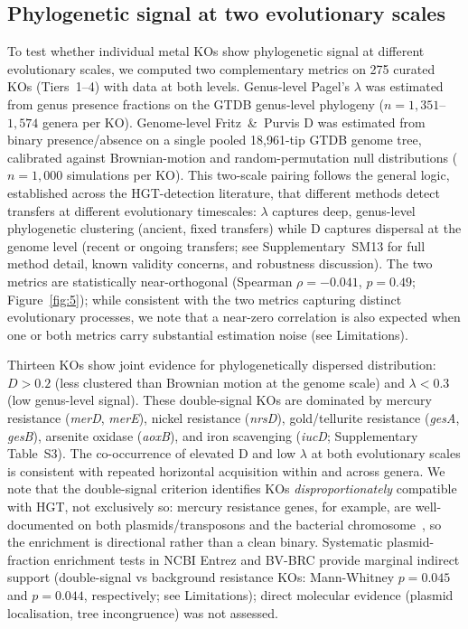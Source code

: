 \documentclass[times]{zHenriquesLab-StyleBioRxiv}
\begin{document}


\subsection{Phylogenetic signal at two evolutionary scales}
\label{ss:phylod}

To test whether individual metal KOs show phylogenetic signal at different evolutionary scales, we computed two complementary metrics on 275 curated KOs (Tiers~1--4) with data at both levels.
Genus-level Pagel's $\lambda$ was estimated from genus presence fractions on the GTDB genus-level phylogeny ($n = 1{,}351$--$1{,}574$ genera per KO).
Genome-level Fritz~\&~Purvis D was estimated from binary presence/absence on a single pooled 18{,}961-tip GTDB genome tree, calibrated against Brownian-motion and random-permutation null distributions ($n = 1{,}000$ simulations per KO).
This two-scale pairing follows the general logic, established across the HGT-detection literature, that different methods detect transfers at different evolutionary timescales: $\lambda$ captures deep, genus-level phylogenetic clustering (ancient, fixed transfers) while D captures dispersal at the genome level (recent or ongoing transfers; see Supplementary~SM13 for full method detail, known validity concerns, and robustness discussion).
The two metrics are statistically near-orthogonal (Spearman $\rho = -0.041$, $p = 0.49$; Figure~\ref{fig:5}); while consistent with the two metrics capturing distinct evolutionary processes, we note that a near-zero correlation is also expected when one or both metrics carry substantial estimation noise (see Limitations).

Thirteen KOs show joint evidence for phylogenetically dispersed distribution: $D > 0.2$ (less clustered than Brownian motion at the genome scale) and $\lambda < 0.3$ (low genus-level signal). These double-signal KOs are dominated by mercury resistance (\textit{merD}, \textit{merE}), nickel resistance (\textit{nrsD}), gold/tellurite resistance (\textit{gesA}, \textit{gesB}), arsenite oxidase (\textit{aoxB}), and iron scavenging (\textit{iucD}; Supplementary Table~S3). The co-occurrence of elevated D and low $\lambda$ at both evolutionary scales is consistent with repeated horizontal acquisition within and across genera. We note that the double-signal criterion identifies KOs \emph{disproportionately} compatible with HGT, not exclusively so: mercury resistance genes, for example, are well-documented on both plasmids/transposons and the bacterial chromosome~\cite{silver2005}, so the enrichment is directional rather than a clean binary. Systematic plasmid-fraction enrichment tests in NCBI Entrez and BV-BRC provide marginal indirect support (double-signal vs background resistance KOs: Mann-Whitney $p = 0.045$ and $p = 0.044$, respectively; see Limitations); direct molecular evidence (plasmid localisation, tree incongruence) was not assessed.
\end{document}
